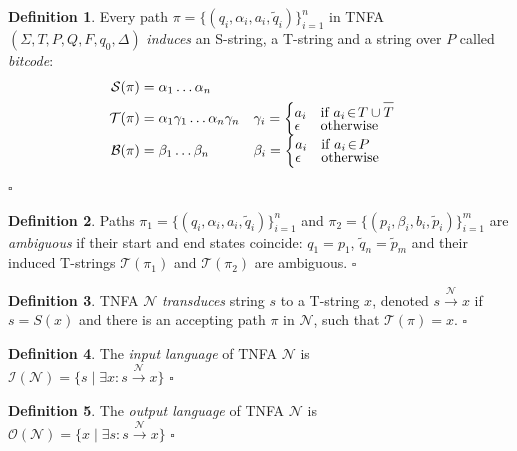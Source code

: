 \documentclass{article}
\newcommand{\Xin}{\!\in\!}
\newcommand{\Xeq}{\!=\!}
\newcommand{\XB}{\mathcal{B}}
\newcommand{\XI}{\mathcal{I}}
\newcommand{\XN}{\mathcal{N}}
\newcommand{\XO}{\mathcal{O}}
\newcommand{\XS}{\mathcal{S}}
\newcommand{\XT}{\mathcal{T}}
\newcommand*{\Xbar}[1]{\overline{#1\vphantom{\bar{#1}}}}
\theoremstyle{definition}
\newtheorem{Xdef}{Definition}
\begin{document}
\begin{multicols}{2}
    \begin{Xdef}
    Every path $\pi \Xeq \{(q_i, \alpha_i, a_i, \widetilde{q}_i)\}_{i=1}^n$
    in TNFA $(\Sigma, T, P, Q, F, q_0, \Delta)$
    \emph{induces} an S-string, a T-string and a string over $P$ called \emph{bitcode}:
    \begin{align*}
    \XS(\pi) &= \alpha_1 \dots \alpha_n \\
    \XT(\pi) &= \alpha_1 \gamma_1 \dots \alpha_n \gamma_n
    &&\gamma_i = \begin{cases}
            a_i &\text{if } a_i \Xin T \cup \Xbar{T} \\[-0.5em]
            \epsilon &\text{otherwise}
        \end{cases} \\[-0.5em]
    \XB(\pi) &= \beta_1 \dots \beta_n
    &&\beta_i = \begin{cases}
            a_i &\text{if } a_i \Xin P \\[-0.5em]
            \epsilon &\text{otherwise}
        \end{cases}
    \end{align*}
    $\square$
    \end{Xdef}

    \begin{Xdef}
    Paths
    $\pi_1 \Xeq \{(q_i, \alpha_i, a_i, \widetilde{q}_i)\}_{i=1}^n$ and
    $\pi_2 \Xeq \{(p_i, \beta_i, b_i, \widetilde{p}_i)\}_{i=1}^m$
    are \emph{ambiguous} if their start and end states coincide: $q_1 \Xeq p_1$, $\widetilde{q}_n \Xeq \widetilde{p}_m$
    and their induced T-strings $\XT(\pi_1)$ and $\XT(\pi_2)$ are ambiguous.
    $\square$
    \end{Xdef}

    \begin{Xdef}
    TNFA $\XN$ \emph{transduces} string $s$ to a T-string $x$, denoted $s \xrightarrow{\XN} x$
    if $s \Xeq S(x)$ and there is an accepting path $\pi$ in $\XN$, such that $\XT(\pi) \Xeq x$.
    $\square$
    \end{Xdef}

    \begin{Xdef}
    The \emph{input language} of TNFA $\XN$ is \\
    $\XI(\XN) \Xeq \{ s \mid \exists x: s \xrightarrow{\XN} x \}$
    $\square$
    \end{Xdef}

    \begin{Xdef}
    The \emph{output language} of TNFA $\XN$ is \\
    $\XO(\XN) \Xeq \{ x \mid \exists s: s \xrightarrow{\XN} x \}$
    $\square$
    \end{Xdef}



\end{multicols}
\end{document}

